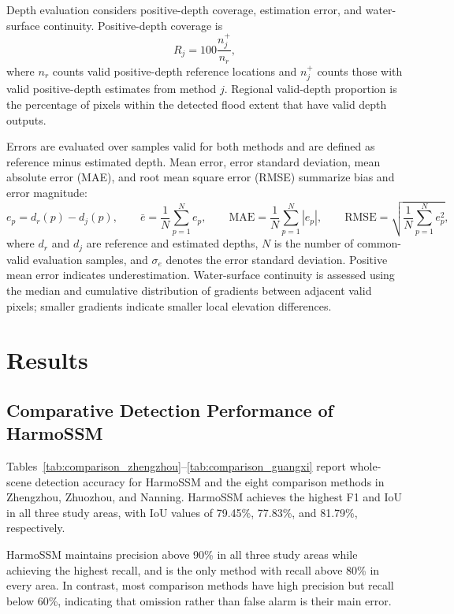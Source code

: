 \documentclass[authoryear,preprint,12pt]{elsarticle}
\begin{document}
Depth evaluation considers positive-depth coverage, estimation error, and water-surface continuity. Positive-depth coverage is
\begin{equation}\label{eq:valid_depth_ratio}
 R_j=100\frac{n_j^{+}}{n_r},
\end{equation}
where \(n_r\) counts valid positive-depth reference locations and \(n_j^{+}\) counts those with valid positive-depth estimates from method \(j\). Regional valid-depth proportion is the percentage of pixels within the detected flood extent that have valid depth outputs.

Errors are evaluated over samples valid for both methods and are defined as reference minus estimated depth. Mean error, error standard deviation, mean absolute error (MAE), and root mean square error (RMSE) summarize bias and error magnitude:
\begin{equation}\label{eq:depth_error_stats}
 e_p=d_r(p)-d_j(p),\qquad
 \bar e=\frac{1}{N}\sum_{p=1}^{N}e_p,\qquad
 \mathrm{MAE}=\frac{1}{N}\sum_{p=1}^{N}\left|e_p\right|,\qquad
 \mathrm{RMSE}=\sqrt{\frac{1}{N}\sum_{p=1}^{N}e_p^{2}},
\end{equation}
where \(d_r\) and \(d_j\) are reference and estimated depths, \(N\) is the number of common-valid evaluation samples, and \(\sigma_e\) denotes the error standard deviation. Positive mean error indicates underestimation. Water-surface continuity is assessed using the median and cumulative distribution of gradients between adjacent valid pixels; smaller gradients indicate smaller local elevation differences.

\FloatBarrier
\endgroup

\section{Results}

\subsection{Comparative Detection Performance of HarmoSSM}\label{sec:detection_results}

Tables~\ref{tab:comparison_zhengzhou}--\ref{tab:comparison_guangxi} report whole-scene detection accuracy for HarmoSSM and the eight comparison methods in Zhengzhou, Zhuozhou, and Nanning. HarmoSSM achieves the highest F1 and IoU in all three study areas, with IoU values of 79.45\%, 77.83\%, and 81.79\%, respectively.

HarmoSSM maintains precision above 90\% in all three study areas while achieving the highest recall, and is the only method with recall above 80\% in every area. In contrast, most comparison methods have high precision but recall below 60\%, indicating that omission rather than false alarm is their main error.
\end{document}
